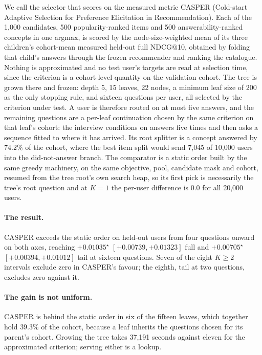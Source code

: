 \documentclass[runningheads]{llncs}
\begin{document}
We call the selector that scores on the measured metric CASPER (Cold-start Adaptive Selection for
Preference Elicitation in Recommendation). Each of the 1{,}000 candidates, 500
popularity-ranked items and 500 answerability-ranked concepts in one argmax, is scored by the
node-size-weighted mean of its three children's cohort-mean measured held-out full NDCG@10, obtained
by folding that child's answers through the frozen recommender and ranking the catalogue. Nothing is
approximated and no test user's targets are read at selection time, since the criterion is a cohort-level
quantity on the validation cohort. The tree is grown there and frozen: depth 5, 15 leaves, 22 nodes,
a minimum leaf size of 200 as the only stopping rule, and sixteen questions per user, all selected by
the criterion under test. A user is therefore routed on at most five answers, and the remaining
questions are a per-leaf continuation chosen by the same criterion on that leaf's cohort: the
interview conditions on answers five times and then asks a sequence fitted to where it has arrived. Its root splitter is a concept answered by $74.2\%$ of the cohort, where
the best item split would send 7{,}045 of 10{,}000 users into the did-not-answer branch. The
comparator is a static order built by the same greedy machinery, on the same objective, pool,
candidate mask and cohort, resumed from the tree root's own search heap, so its first pick is
necessarily the tree's root question and at $K{=}1$ the per-user difference is $0.0$ for all
20{,}000 users.


\paragraph{The result.}
CASPER exceeds the static order on held-out users from four questions onward on both axes, reaching
$+0.01035^\star$ $[+0.00739,+0.01323]$ full and $+0.00705^\star$ $[+0.00394,+0.01012]$ tail at
sixteen questions. Seven of the eight $K\ge2$ intervals exclude zero in CASPER's favour; the eighth,
tail at two questions, excludes zero against it.

\paragraph{The gain is not uniform.}
CASPER is behind the static order in six of the fifteen leaves, which together hold $39.3\%$ of
the cohort, because a leaf inherits the questions chosen for its parent's cohort. Growing the tree
takes 37{,}191 seconds against eleven for the approximated criterion; serving either is a lookup.
\end{document}
